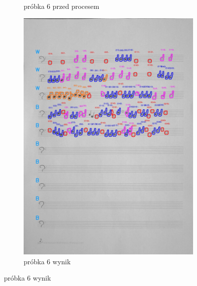 \documentclass[11pt]{article}
\begin{document}
\begin{figure}
\begin{subfigure}[b]{0.475\textwidth}
        {{\small próbka 6 przed procesem}}
        \label{fig:sub3}
    \end{subfigure}
    \quad
    \begin{subfigure}[b]{0.475\textwidth}
        \centering
        \graphicspath{ {blobs/} }
        \includegraphics[width=\textwidth]{6_cnts.jpg}
        \caption[]%
        {{\small próbka 6 wynik}}
        \label{fig:sub 4}
    \end{subfigure}
    \label{fig 1}
\end{figure}

\FloatBarrier
\end{document}
